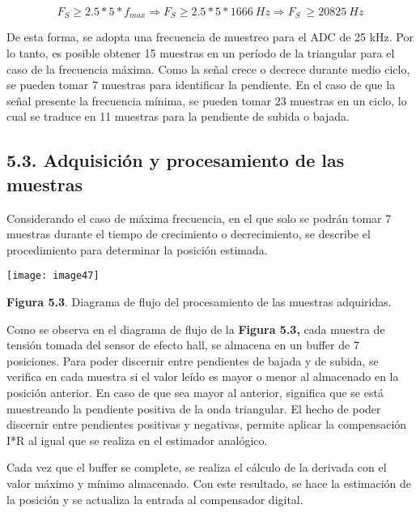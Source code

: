 \documentclass{article} %
\begin{document}
\noindent 
\[F_S\ge 2.5*5*f_{max}\Rightarrow F_S\ge 2.5*5*1666\ Hz\Rightarrow F_S\ \ge 20825\ Hz\] 


\noindent De esta forma, se adopta una frecuencia de muestreo para el ADC de  25 kHz. Por lo tanto, es posible obtener 15 muestras en un per\'{i}odo de la triangular para el caso de la frecuencia m\'{a}xima. Como la se\~{n}al crece o decrece durante medio ciclo, se pueden tomar 7 muestras para identificar la pendiente. En el caso de que la se\~{n}al presente la frecuencia m\'{i}nima, se pueden tomar 23 muestras en un ciclo, lo cual se traduce en 11 muestras para la pendiente de subida o bajada. 

\noindent 

\noindent 
\subsection{5.3. Adquisici\'{o}n y procesamiento de las muestras}

\noindent Considerando el caso de m\'{a}xima frecuencia, en el que solo se podr\'{a}n tomar 7 muestras durante el tiempo de crecimiento o decrecimiento, se describe el procedimiento para determinar la posici\'{o}n estimada.

\noindent \texttt{[image: image47]}

\noindent 

\noindent \textbf{Figura 5.3}. Diagrama de flujo del procesamiento de las muestras adquiridas.

\noindent 

\noindent Como se observa en el diagrama de flujo de la \textbf{Figura 5.3,} cada muestra de tensi\'{o}n tomada del sensor de efecto hall, se almacena en un buffer de 7 posiciones. Para poder discernir entre pendientes de bajada y de subida, se verifica en cada muestra si el valor le\'{i}do es mayor o menor al almacenado en la posici\'{o}n anterior. En caso de que sea mayor al anterior, significa que se est\'{a} muestreando la pendiente positiva de la onda triangular. El hecho de poder discernir entre pendientes positivas y negativas, permite aplicar la compensaci\'{o}n I*R al igual que se realiza en el estimador anal\'{o}gico. 

\noindent 

\noindent Cada vez que el buffer se complete, se realiza el c\'{a}lculo de la derivada con el valor m\'{a}ximo y m\'{i}nimo almacenado. Con este resultado, se hace la estimaci\'{o}n de la posici\'{o}n y se actualiza la entrada al compensador digital.
\end{document}
